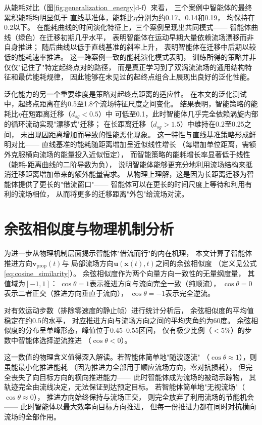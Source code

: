 从能耗对比（图\ref{fig:generalization_energy}d-f）来看，
三个案例中智能体的最终累积能耗均明显低于
直线基准体，能耗比$\eta$分别为约0.17、0.14和0.19，
均保持在0.2以下。
在能耗曲线的时间演化特征上，三个案例呈现出共同模式——
智能体曲线（绿色）在迁移初期几乎水平，
表明智能体在运动早期大量依赖流场漂移而非自身推进；
随后曲线以低于直线基准的斜率上升，
表明智能体在迁移中后期以较低的能耗速率推进。
这一跨案例一致的能耗演化模式表明，
训练所得的策略并非仅仅"记住了"特定起终点对的路径，
而是真正学习到了双涡流流场的通用结构特征和最优能耗规律，
因此能够在未见过的起终点组合上展现出良好的泛化性能。

泛化能力的另一个重要维度是策略对起终点距离的适应性。
在本文的泛化测试中，起终点距离在约0.5至1.8个流场特征尺度之间变化。
结果表明，智能策略的能耗比$\eta$在短距离迁移（$d_{sg} < 0.5$）中
可低至0.1，此时智能体几乎完全依赖涡旋内部的循环流动实现"漂移式"迁移；
在长距离迁移（$d_{sg} > 1.5$）中维持在0.2至0.25之间，
未出现因距离增加而导致的性能恶化现象。
这一特性与直线基准策略形成鲜明对比——
直线基准的能耗随距离增加呈近似线性增长
（每增加单位距离，需额外克服横向流场的能量投入近似恒定），
而智能策略的能耗增长率显著低于线性
（能耗-距离曲线的二阶导数为负），
说明智能体能够更充分地利用流场结构来抵消迁移距离增加带来的额外能量需求。
从物理上理解，这是因为长距离迁移为智能体提供了更长的"借流窗口"——
智能体可以在更长的时间尺度上等待和利用有利的流场相位，
从而将更多的迁移距离"外包"给流场对流。

\section{余弦相似度与物理机制分析}

为进一步从物理机制层面揭示智能体"借流而行"的内在机理，
本文计算了智能体推进方向$\mathbf{v}_{\text{prop}}(t)$与
局部流场方向$\mathbf{u}(\mathbf{x}(t), t)$之间的余弦相似度
（定义见公式\ref{eq:cosine_similarity}）。
余弦相似度作为两个向量方向一致性的无量纲度量，
其值域为$[-1, 1]$：
$\cos\theta = 1$表示推进方向与流向完全一致（纯顺流），
$\cos\theta = 0$表示二者正交（推进方向垂直于流向），
$\cos\theta = -1$表示完全逆流。

对有效运动步数（排除零速度的静止帧）进行统计分析后，
余弦相似度的平均值稳定在约0.5的水平，
对应推进方向与流场方向之间的平均夹角约为60度。
余弦相似度的分布呈单峰形态，峰值位于0.45--0.55区间，
仅有极少比例（$<5\%$）的步数中智能体选择逆流推进
（$\cos\theta < 0$）。

这一数值的物理含义值得深入解读。若智能体简单地"随波逐流"
（$\cos\theta \approx 1$），则虽能最小化推进能耗
（因为推进力全部用于顺应流场方向，零对抗损耗），
但完全丧失了向目标方向的横向推进能力——
此时智能体成为流场的被动示踪物，
其轨迹完全由流线决定，无法保证到达预定目标。
若智能体简单地"无视流场"（$\cos\theta \approx 0$），
推进方向始终保持与流场正交，
则完全放弃了利用流场的节能机会——
此时智能体以最大效率向目标方向推进，
但每一份推进力都在同时对抗横向流场的全部作用。

